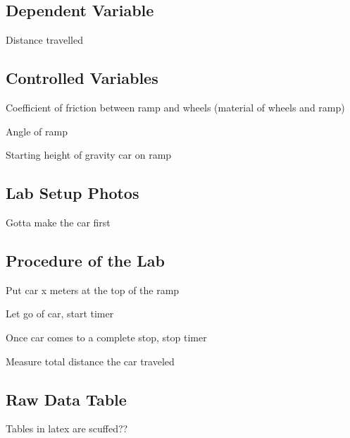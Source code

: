 \documentclass[12pt]{article}
\begin{document}
\subsection{Dependent Variable} Distance travelled

\subsection{Controlled Variables}
\begin{list}
    \item Coefficient of friction between ramp and wheels (material of wheels and ramp)
    \item Angle of ramp
    \item Starting height of gravity car on ramp
\end{list}

\subsection{Lab Setup Photos}

Gotta make the car first
\subsection{Procedure of the Lab}

Put car x meters at the top of the ramp

Let go of car, start timer

Once car comes to a complete stop, stop timer

Measure total distance the car traveled

\subsection{Raw Data Table}

Tables in latex are scuffed??
\end{document}
